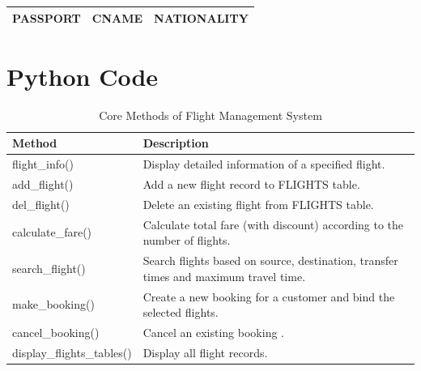 \documentclass[12pt,a4paper]{article}
\begin{document}
\vspace{1em}

\begin{tabular}{|c|c|c|}
\hline
PASSPORT & CNAME & NATIONALITY \\
\hline
\end{tabular}

\vspace{1em}

\newpage
\section*{Python Code} 
\begin{table}[h]
\centering
\caption{Core Methods of Flight Management System}
\begin{tabular}{|l|p{10cm}|}
\hline
\textbf{Method}         & \textbf{Description} \\
\hline
flight\_info()          & Display detailed information of a specified flight. \\
\hline
add\_flight()           & Add a new flight record to FLIGHTS table. \\
\hline
del\_flight()           & Delete an existing flight from FLIGHTS table. \\
\hline
calculate\_fare()       & Calculate total fare (with discount) according to the number of flights. \\
\hline
search\_flight()        & Search flights based on source, destination, transfer times and maximum travel time. \\
\hline
make\_booking()         & Create a new booking for a customer and bind the selected flights. \\
\hline
cancel\_booking()       & Cancel an existing booking .\\
\hline
display\_flights\_tables() & Display all flight records. \\
\hline
\end{tabular}
\end{table}

\end{document}
